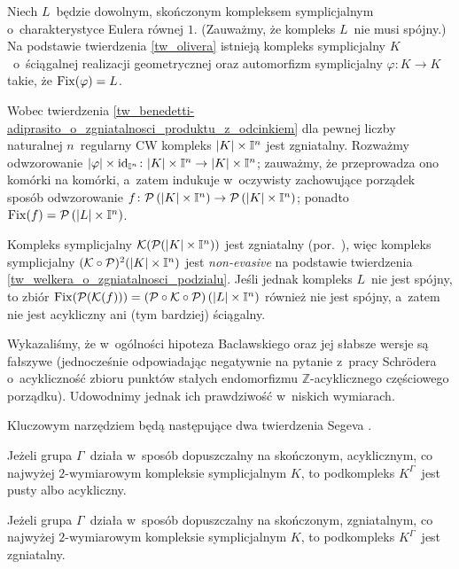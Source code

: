 \begin{ex}\label{ex-mocne_obalenie_baclawskiego}
Niech $L$~będzie dowolnym, skończonym kompleksem symplicjalnym o~charakterystyce Eulera równej $1$. (Zauważmy, że kompleks $L$~nie musi spójny.) Na podstawie twierdzenia \ref{tw_olivera} istnieją kompleks symplicjalny $K$~o~ściągalnej realizacji geometrycznej oraz automorfizm symplicjalny $\varphi\colon K\to K$ takie, że $\operatorname{Fix}(\varphi)=L$.

Wobec twierdzenia \ref{tw_benedetti-adiprasito_o_zgniatalnosci_produktu_z_odcinkiem} dla pewnej liczby naturalnej $n$~regularny CW kompleks \mbox{$|K|\times \mathbb{I}^n$} jest zgniatalny. Rozważmy odwzorowanie \mbox{$|\varphi|\times \operatorname{id}_{\mathbb{I}^n}\colon |K|\times \mathbb{I}^n\to |K|\times \mathbb{I}^n$}; zauważmy, że przeprowadza ono komórki na komórki, a~zatem indukuje w~oczywisty zachowujące porządek sposób odwzorowanie $f\colon \mathcal{P}\left(|K|\times \mathbb{I}^n\right)\to \mathcal{P}\left(|K|\times \mathbb{I}^n\right)$; ponadto $\operatorname{Fix}(f)=\mathcal{P}\left(|L|\times \mathbb{I}^n\right)$.

Kompleks symplicjalny $\mathcal{K}(\mathcal{P}(|K|\times \mathbb{I}^n))$ jest zgniatalny (por.~\cite[Theorems 1.4, 12.1]{Forman98}), więc kompleks symplicjalny $(\mathcal{K}\circ\mathcal{P})^2(|K|\times \mathbb{I}^n)$ jest \textit{non-evasive} na podstawie twierdzenia \ref{tw_welkera_o_zgniatalnosci_podzialu}. Jeśli jednak kompleks $L$~nie jest spójny, to zbiór $\operatorname{Fix}(\mathcal{P}(\mathcal{K}(f)))=(\mathcal{P}\circ\mathcal{K}\circ\mathcal{P})\left(|L|\times \mathbb{I}^n\right)$ również nie jest spójny, a~zatem nie jest acykliczny ani (tym bardziej) ściągalny.  
\end{ex}

Wykazaliśmy, że w~ogólności hipoteza Baclawskiego oraz jej słabsze wersje są fałszywe (jednocześnie odpowiadając negatywnie na pytanie z~pracy Schr{\"o}dera \cite[Open Question 11]{Schroder99} o~acykliczność zbioru punktów stałych endomorfizmu $\mathbb{Z}$-acyklicznego częściowego porządku). Udowodnimy jednak ich prawdziwość w~niskich wymiarach.

Kluczowym narzędziem będą następujące dwa twierdzenia Segeva \cite{Segev93,Segev94}.

\begin{tw}\label{tw-segeva_o_acyklicznych}
Jeżeli grupa $\Gamma$~działa w~sposób dopuszczalny na skończonym, acyklicznym, co najwyżej $2$-wymiarowym kompleksie symplicjalnym $K$, to podkompleks $K^\Gamma$~jest pusty albo acykliczny.
\end{tw}

\begin{tw}\label{tw-segeva_o_zgniatalnych}
Jeżeli grupa $\Gamma$~działa w~sposób dopuszczalny na skończonym, zgniatalnym, co najwyżej $2$-wymiarowym kompleksie symplicjalnym $K$, to podkompleks $K^\Gamma$~jest zgniatalny.
\end{tw}


